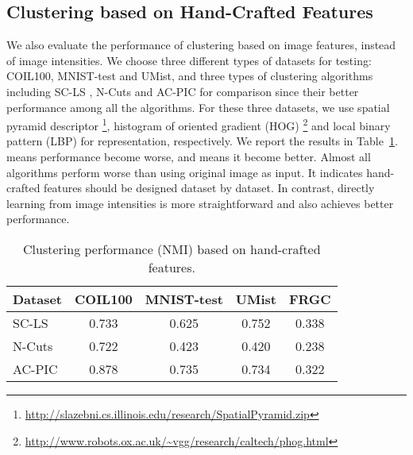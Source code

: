 \documentclass[10pt,twocolumn,letterpaper]{article}
\begin{document}
\subsection{Clustering based on Hand-Crafted Features}
\label{Ap_Cluster_Hand_Crafted}
We also evaluate the performance of clustering based on image features, instead of image intensities. We choose three different types of datasets for testing: COIL100, MNIST-test and UMist, and three types of clustering algorithms including SC-LS \cite{chen2011large}, N-Cuts \cite{shi2000normalized} and AC-PIC \cite{zhang2013agglomerative} for comparison since their better performance among all the algorithms. For these three datasets, we use spatial pyramid descriptor \cite{lazebnik2006beyond}\footnote{\url{http://slazebni.cs.illinois.edu/research/SpatialPyramid.zip}}, histogram of oriented gradient (HOG) \cite{dalal2005histograms}\footnote{\url{http://www.robots.ox.ac.uk/~vgg/research/caltech/phog.html}} and local binary pattern (LBP) \cite{ojala1996comparative} for representation, respectively. We report the results in Table~\ref{TB_CLustering_Results_Feats}.  means performance become worse, and  means it become better. Almost all algorithms perform worse than using original image as input. It indicates hand-crafted features should be designed dataset by dataset. In contrast, directly learning from image intensities is more straightforward and also achieves better performance.
\begin{table}
\caption{{Clustering performance (NMI) based on hand-crafted features.}}
\vspace{-5pt}
\center
\small
\begin{tabular}{@{}lcccc@{}}
  \toprule
  Dataset                              &COIL100 &MNIST-test &UMist &FRGC    \\   
  \midrule  
  SC-LS \cite{chen2011large}        &0.733   &0.625       &{0.752} &0.338 \\
  
  N-Cuts \cite{shi2000normalized}      &0.722   &0.423      &{0.420} &0.238 \\  
  
  AC-PIC \cite{zhang2013agglomerative} &0.878   &0.735      &{0.734} &0.322 \\  
  \bottomrule
\end{tabular}
\label{TB_CLustering_Results_Feats}
\end{table}
\newpage
\end{document}
